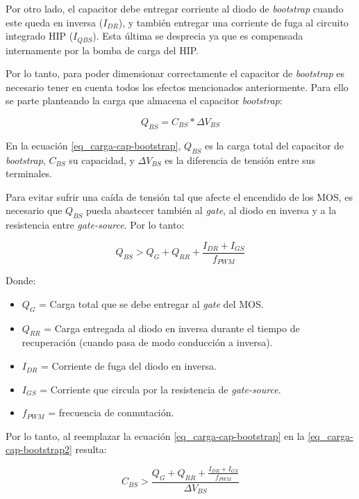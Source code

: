 \noindent Por otro lado, el capacitor debe entregar corriente al diodo de \textsl{bootstrap} cuando este queda en inversa ($I_{DR}$), y también entregar una corriente de fuga al circuito integrado HIP ($I_{QBS}$). Esta última se desprecia ya que es compensada internamente por la bomba de carga del HIP.

\noindent Por lo tanto, para poder dimensionar correctamente el capacitor de \textsl{bootstrap} es necesario tener en cuenta todos los efectos mencionados anteriormente. Para ello se parte planteando la carga que almacena el capacitor \textsl{bootstrap}:

\begin{equation} \label{eq_carga-cap-bootstrap}
	Q_{BS}=C_{BS}*\Delta V_{BS}
\end{equation}

\noindent En la ecuación \ref{eq_carga-cap-bootstrap}, $Q_{BS}$ es la carga total del capacitor de \textsl{bootstrap}, $C_{BS}$ su capacidad, y $\Delta V_{BS}$ es la diferencia de  tensión entre sus terminales. 

\noindent Para evitar sufrir una caída de tensión tal que afecte el encendido de los MOS, es necesario que $Q_{BS}$ pueda abastecer también al \textsl{gate}, al diodo en inversa y a la resistencia entre \textsl{gate-source}. Por lo tanto:

\begin{equation} \label{eq_carga-cap-bootstrap2}
	Q_{BS} > Q_G + Q_{RR} + \frac{I_{DR}+I_{GS}}{f_{PWM}}
\end{equation}

\noindent Donde:
\begin{itemize}
	\item $Q_G$ = Carga total que se debe entregar al \textsl{gate} del MOS.
	\item $Q_{RR}$ = Carga entregada al diodo en inversa durante el tiempo de recuperación (cuando pasa de modo conducción a inversa).
	\item $I_{DR}$ = Corriente de fuga del diodo en inversa.
	\item $I_{GS}$ = Corriente que circula por la resistencia de \textsl{gate-source}.
	\item $f_{PWM}$ = frecuencia de conmutación.
\end{itemize}


\noindent Por lo tanto, al reemplazar la ecuación \ref{eq_carga-cap-bootstrap} en la \ref{eq_carga-cap-bootstrap2} resulta:


\begin{equation} \label{eq_cap-bootstrap}
	C_{BS} > \frac{Q_G+Q_{RR} + \frac{I_{DR}+I_{GS}}{f_{PWM}}}{\Delta V_{BS}}
\end{equation}

